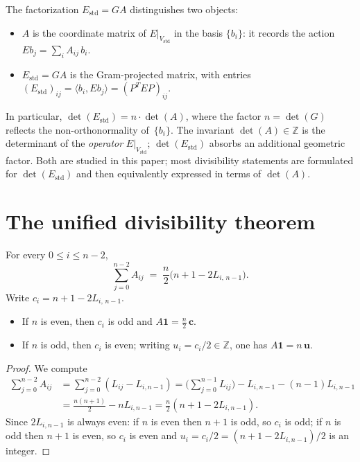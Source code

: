 \documentclass[11pt,a4paper]{article}
\newcommand{\ZZ}{\mathbb{Z}}
\newcommand{\one}{\mathbf{1}}
\newcommand{\Estd}{E_{\mathrm{std}}}
\newcommand{\Vstd}{V_{\mathrm{std}}}
\begin{document}
\begin{remark}\label{rem:objects}
The factorization $\Estd = GA$ distinguishes two objects:
\begin{itemize}[nosep]
  \item $A$ is the coordinate matrix of $E|_{\Vstd}$ in the basis
        $\{b_i\}$: it records the action $Eb_j = \sum_i A_{ij}\,b_i$.
  \item $\Estd = GA$ is the Gram-projected matrix, with entries
        $(\Estd)_{ij} = \langle b_i, Eb_j \rangle = (P^TEP)_{ij}$.
\end{itemize}
In particular, $\det(\Estd) = n\cdot\det(A)$, where the factor
$n = \det(G)$ reflects the non-orthonormality of~$\{b_i\}$.
The invariant $\det(A) \in \ZZ$ is the determinant of the
\emph{operator} $E|_{\Vstd}$; $\det(\Estd)$ absorbs an additional
geometric factor.  Both are studied in this paper; most divisibility
statements are formulated for $\det(\Estd)$ and then equivalently
expressed in terms of $\det(A)$.
\end{remark}

\section{The unified divisibility theorem}\label{sec:unified}

\begin{lemma}\label{lem:rowsum}
For every $0\le i\le n-2$,
\[
  \sum_{j=0}^{n-2} A_{ij}
  \;=\; \frac{n}{2}\bigl(n+1-2L_{i,\,n-1}\bigr).
\]
Write $c_i=n+1-2L_{i,\,n-1}$.
\begin{itemize}
  \item If $n$ is even, then $c_i$ is odd and $A\one=\frac{n}{2}\,\mathbf{c}$.
  \item If $n$ is odd, then $c_i$ is even; writing $u_i=c_i/2\in\ZZ$,
        one has $A\one=n\,\mathbf{u}$.
\end{itemize}
\end{lemma}

\begin{proof}
We compute
\begin{align*}
  \sum_{j=0}^{n-2} A_{ij}
  &= \sum_{j=0}^{n-2}(L_{ij}-L_{i,n-1})
  = \biggl(\sum_{j=0}^{n-1}L_{ij}\biggr) - L_{i,n-1} - (n-1)L_{i,n-1} \\
  &= \frac{n(n+1)}{2} - nL_{i,n-1}
  = \frac{n}{2}(n+1-2L_{i,n-1}).
\end{align*}
Since $2L_{i,n-1}$ is always even: if $n$ is even then $n+1$ is odd, so
$c_i$ is odd; if $n$ is odd then $n+1$ is even, so $c_i$ is even and
$u_i=c_i/2=(n+1-2L_{i,n-1})/2$ is an integer.
\end{proof}
\end{document}
